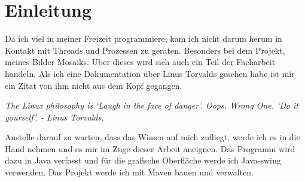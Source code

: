 \section{Einleitung}
Da ich viel in meiner Freizeit programmiere, kam ich nicht darum herum in Kontakt mit Threads und Prozessen zu geraten. Besonders bei dem Projekt, meines Bilder Mosaiks. Über dieses wird sich auch ein Teil der Facharbeit handeln. Als ich eine Dokumentation über Linus Torvalds gesehen habe ist mir ein Zitat von ihm nicht aus dem Kopf gegangen.\\
\begin{center}
    \textit{The Linux philosophy is ‘Laugh in the face of danger’. Oops. Wrong One. ‘Do it yourself’. - Linus Torvalds.}
\end{center}
Anstelle darauf zu warten, dass das Wissen auf mich zufliegt, werde ich es in die Hand nehmen und es mir im Zuge dieser Arbeit aneignen. Das Programm wird dazu in Java verfasst und für die grafische Oberfläche werde ich Java-swing verwenden. Das Projekt werde ich mit Maven bauen und verwalten.